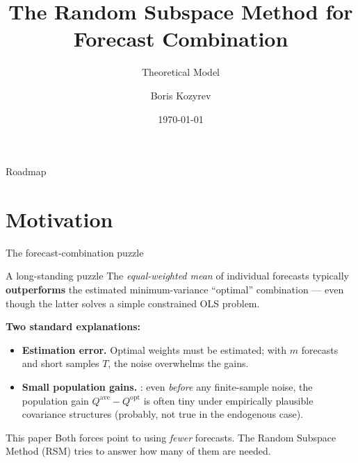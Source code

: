\documentclass[11pt,aspectratio=169]{beamer}
\title[RSM: Theoretical Model]{The Random Subspace Method for Forecast Combination}
\subtitle{Theoretical Model}
\author[Kozyrev]{Boris Kozyrev}
\institute[]{Job Market Paper}
\date{\today}
\newcommand{\Qopt}{Q^{\mathrm{opt}}}
\newcommand{\Qave}{Q^{\mathrm{ave}}}
\begin{document}
\begin{frame}[plain]
  \titlepage
\end{frame}

\begin{frame}{Roadmap}
  \tableofcontents
\end{frame}

\section{Motivation}

\begin{frame}{The forecast-combination puzzle}
  \begin{block}{A long-standing puzzle}
    The \emph{equal-weighted mean} of individual forecasts typically
    \textbf{outperforms} the estimated minimum-variance ``optimal''
    combination --- even though the latter solves a simple constrained
    OLS problem.
    \hfill {\footnotesize \citep*{BatesGranger1969,GrangerRamanathan1984}}
  \end{block}

  \textbf{Two standard explanations:}
  \begin{itemize}
    \item \textbf{Estimation error.} Optimal weights must be estimated;
      with $m$ forecasts and short samples $T$, the noise overwhelms the gains.
    \item \textbf{Small population gains.} \citet*{ElliottLiao2025}: even
      \emph{before} any finite-sample noise, the population gain
      $\Qave-\Qopt$ is often tiny under empirically plausible covariance
      structures (probably, not true in the endogenous case).
  \end{itemize}

  \begin{alertblock}{This paper}
    Both forces point to using \emph{fewer} forecasts. The Random Subspace
    Method (RSM) tries to answer how many of them are needed.
  \end{alertblock}
\end{frame}
\end{document}
